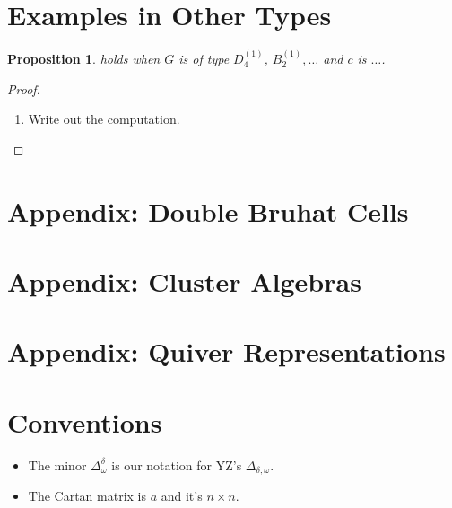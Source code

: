 \documentclass[11pt]{amsart}
\newtheorem{proposition}[theorem]{Proposition}
\begin{document}
\section{Examples in Other Types}

\begin{proposition}
 holds when $G$ is of type $D_4^{(1)}$, $B_2^{(1)},\dotsc$ and $c$ is $\dotsc$. 
\end{proposition}
\begin{proof}
\begin{enumerate}
\item Write out the computation.
\end{enumerate}
\end{proof}

\section{Appendix: Double Bruhat Cells}
\section{Appendix: Cluster Algebras}
\section{Appendix: Quiver Representations}

\section{Conventions}

\begin{itemize}
\item The minor $\Delta_\omega^\delta$ is our notation for YZ's $\Delta_{\delta, \omega}$.
\item The Cartan matrix is $a$ and it's $n \times n$.
\end{itemize}
\end{document}
